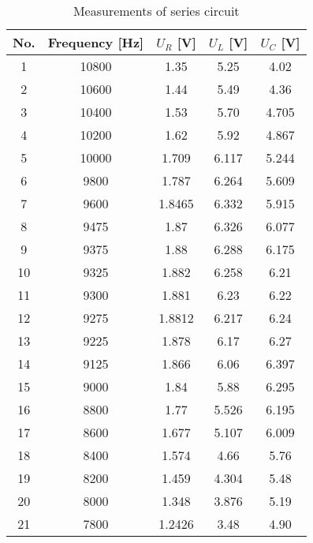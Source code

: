 \begin{table}[hptb]
	\centering
	\caption{Measurements of series circuit}
	\label{tab:tab1}
	\begin{tabular}{|c|c|c|c|c|}
		\hline
		No. & Frequency [\unit{\hertz}] & $U_R$ [\unit{\volt}] & $U_L$ [\unit{\volt}] & $U_C$ [\unit{\volt}] \\   
		\hline
		1& 10800 & 1.35 & 5.25 & 4.02\\
		\hline
		2& 10600 & 1.44 & 5.49 & 4.36\\
		\hline
		3& 10400 & 1.53 & 5.70 & 4.705\\
		\hline
		4& 10200 & 1.62 & 5.92 & 4.867\\
		\hline
        5& 10000 & 1.709 & 6.117 & 5.244\\
		\hline
        6& 9800 & 1.787 & 6.264 & 5.609\\
		\hline
        7& 9600 & 1.8465 & 6.332 & 5.915\\
		\hline
        8& 9475 & 1.87 & 6.326 & 6.077\\
		\hline
        9& 9375 & 1.88 & 6.288 & 6.175\\
		\hline
        10& 9325 & 1.882 & 6.258 & 6.21\\
		\hline
        11& 9300 & 1.881 & 6.23 & 6.22\\
		\hline
        12& 9275 & 1.8812 & 6.217 & 6.24\\
		\hline
        13& 9225 & 1.878 & 6.17 & 6.27\\
		\hline
        14& 9125 & 1.866 & 6.06 & 6.397\\
		\hline
        15& 9000 & 1.84 & 5.88 & 6.295\\
		\hline
        16& 8800 & 1.77 & 5.526 & 6.195\\
		\hline
        17& 8600 & 1.677 & 5.107 & 6.009\\
		\hline
        18& 8400 & 1.574 & 4.66 & 5.76\\
		\hline
        19& 8200 & 1.459 & 4.304 & 5.48\\
		\hline
        20& 8000 & 1.348 & 3.876 & 5.19\\
		\hline
        21& 7800 & 1.2426 & 3.48 & 4.90\\
		\hline
	\end{tabular}
\end{table}